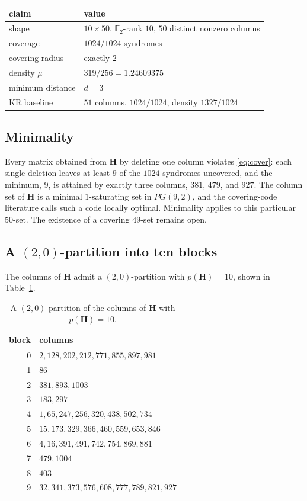 \documentclass[11pt,a4paper]{article}
\newcommand{\FF}{\mathbb{F}}
\newcommand{\HH}{\boldsymbol{H}}
\begin{document}
\begin{center}
\renewcommand{\arraystretch}{1.15}
\begin{tabular}{@{}ll@{}}
\toprule
claim & value \\
\midrule
shape & $10\times 50$, $\FF_2$-rank $10$, $50$ distinct nonzero columns \\
coverage & $1024/1024$ syndromes \\
covering radius & exactly $2$ \\
density $\mu$ & $319/256=1.24609375$ \\
minimum distance & $d=3$ \\
KR baseline & $51$ columns, $1024/1024$, density $1327/1024$ \\
\bottomrule
\end{tabular}
\end{center}

\subsection{Minimality}

Every matrix obtained from $\HH$ by deleting one column violates
\eqref{eq:cover}: each single deletion leaves at least $9$ of the
$1024$ syndromes uncovered, and the minimum, $9$, is attained by
exactly three columns, $381$, $479$, and $927$. The column set of
$\HH$ is a minimal $1$-saturating set in $PG(9,2)$, and the
covering-code literature calls such a code locally optimal.
Minimality applies to this particular $50$-set. The existence of a
covering $49$-set remains open.

\subsection{A $(2,0)$-partition into ten blocks}

The columns of $\HH$ admit a $(2,0)$-partition with $p(\HH)=10$, shown
in Table~\ref{tab:part}.

\begin{table}[ht]
\centering
\renewcommand{\arraystretch}{1.15}
\begin{tabular}{@{}rl@{}}
\toprule
block & columns \\
\midrule
0 & $2,128,202,212,771,855,897,981$ \\
1 & $86$ \\
2 & $381,893,1003$ \\
3 & $183,297$ \\
4 & $1,65,247,256,320,438,502,734$ \\
5 & $15,173,329,366,460,559,653,846$ \\
6 & $4,16,391,491,742,754,869,881$ \\
7 & $479,1004$ \\
8 & $403$ \\
9 & $32,341,373,576,608,777,789,821,927$ \\
\bottomrule
\end{tabular}
\caption{A $(2,0)$-partition of the columns of $\HH$ with $p(\HH)=10$.}
\label{tab:part}
\end{table}
\end{document}
